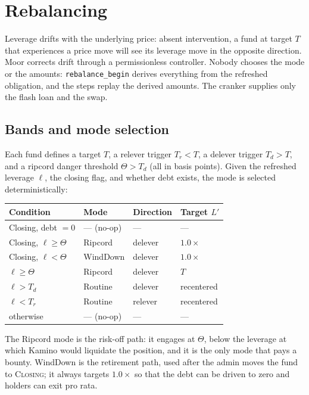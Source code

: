 \documentclass[11pt]{article}
\theoremstyle{remark}
\newcommand{\Lev}{\ell}
\begin{document}
\section{Rebalancing}
\label{sec:rebalance}

Leverage drifts with the underlying price: absent intervention, a fund at target $T$ that experiences a price move will see its leverage move in the opposite direction. Moor corrects drift through a permissionless controller. Nobody chooses the mode or the amounts: \texttt{rebalance\_begin} derives everything from the refreshed obligation, and the steps replay the derived amounts. The cranker supplies only the flash loan and the swap.

\subsection{Bands and mode selection}

Each fund defines a target $T$, a relever trigger $T_r < T$, a delever trigger $T_d > T$, and a ripcord danger threshold $\Theta > T_d$ (all in basis points). Given the refreshed leverage $\Lev$, the closing flag, and whether debt exists, the mode is selected deterministically:

\begin{center}
\begin{tabular}{@{}llll@{}}
\toprule
Condition & Mode & Direction & Target $L'$ \\
\midrule
Closing, debt $=0$ & --- (no-op) & --- & --- \\
Closing, $\Lev \ge \Theta$ & Ripcord & delever & $1.0\times$ \\
Closing, $\Lev < \Theta$ & WindDown & delever & $1.0\times$ \\
$\Lev \ge \Theta$ & Ripcord & delever & $T$ \\
$\Lev > T_d$ & Routine & delever & recentered \\
$\Lev < T_r$ & Routine & relever & recentered \\
otherwise & --- (no-op) & --- & --- \\
\bottomrule
\end{tabular}
\end{center}

The Ripcord mode is the risk-off path: it engages at $\Theta$, below the leverage at which Kamino would liquidate the position, and it is the only mode that pays a bounty. WindDown is the retirement path, used after the admin moves the fund to \textsc{Closing}; it always targets $1.0\times$ so that the debt can be driven to zero and holders can exit pro rata.
\end{document}
